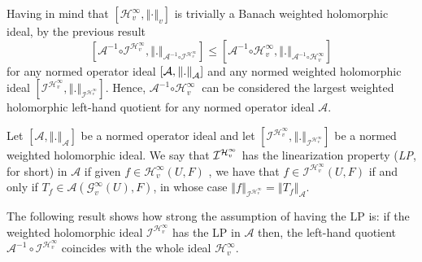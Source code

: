 \documentclass[12pt]{amsart}
\theoremstyle{plain}
\numberwithin{equation}{section}
\begin{document}
Having in mind  that $\left[ \mathcal{H}_{v}^{\infty },\left\Vert \cdot\right\Vert _{v}\right] $ is trivially a Banach weighted holomorphic ideal, by the previous result
\begin{equation*}
\left[ \mathcal{A}^{-1}\mathcal{\circ I}^{\mathcal{H}_{v}^{\infty
}},\left\Vert .\right\Vert _{\mathcal{A}^{-1}\mathcal{\circ I}^{\mathcal{H}%
_{v}^{\infty }}}\right] \leq \left[ \mathcal{A}^{-1}\mathcal{\circ H}%
_{v}^{\infty },\left\Vert .\right\Vert _{\mathcal{A}^{-1}\mathcal{\circ H}%
_{v}^{\infty }}\right]
\end{equation*}%
for any normed operator ideal $\left[ \mathcal{A},\left\Vert .\right\Vert _{%
\mathcal{A}}\right] $ and any normed weighted holomorphic ideal $\left[ \mathcal{I}^{\mathcal{H}_{v}^{\infty }},\left\Vert
.\right\Vert _{\mathcal{I}^{\mathcal{H}_{v}^{\infty }}}\right] $. Hence, $\mathcal{A}^{-1}\mathcal{\circ H}_{v}^{\infty }\ $ can be considered the
largest weighted holomorphic left-hand quotient for any normed operator
ideal $\mathcal{A}$.



Let $\left[ \mathcal{A},\left\Vert .\right\Vert _{\mathcal{A}}\right] $ be a
normed operator ideal and let $\left[ \mathcal{I}^{\mathcal{H}_{v}^{\infty
}},\left\Vert .\right\Vert _{\mathcal{I}^{\mathcal{H}_{v}^{\infty }}}\right] 
$ be a normed weighted holomorphic ideal. We say that $\mathcal{I}^{\mathcal{%
H}_{v}^{\infty }}$ has the linearization property (\textit{LP}, for short)
in $\mathcal{A}$ if given $f\in \mathcal{H}_{v}^{\infty }\left( U,F\right) $%
, we have that $f\in \mathcal{I}^{\mathcal{H}_{v}^{\infty }}\left(
U,F\right) $ if and only if $T_{f}\in \mathcal{A}(\mathcal{G}_{v}^{\infty
}(U),F)$, in whose case $\left\Vert f\right\Vert _{\mathcal{I}^{\mathcal{H}%
_{v}^{\infty }}}=\left\Vert T_f\right\Vert _{\mathcal{A}}.$

The following result shows how strong  the assumption of having the LP is: if
the weighted holomorphic ideal $\mathcal{I}^{\mathcal{H}_{v}^{\infty }}$ has the LP in $\mathcal A$ then, the left-hand quotient $\mathcal A^{-1}\circ \mathcal{I}^{\mathcal{H}_{v}^{\infty }}$ coincides with the whole ideal $\mathcal{H}_{v}^{\infty }$.
\end{document}
